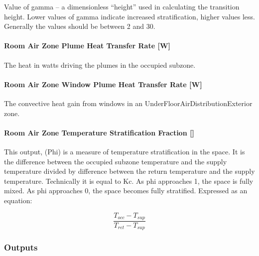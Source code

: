 Value of gamma -- a dimensionless ``height'' used in calculating the transition height. Lower values of gamma indicate increased stratification, higher values less. Generally the values should be between 2 and 30.

\paragraph{Room Air Zone Plume Heat Transfer Rate {[}W{]}}\label{room-air-zone-plume-heat-transfer-rate-w}

The heat in watts driving the plumes in the occupied subzone.

\paragraph{Room Air Zone Window Plume Heat Transfer Rate {[}W{]}}\label{room-air-zone-window-plume-heat-transfer-rate-w}

The convective heat gain from windows in an UnderFloorAirDistributionExterior zone.

\paragraph{\texorpdfstring{Room Air Zone Temperature Stratification Fraction {[]}}{Room Air Zone Temperature Stratification Fraction }}\label{room-air-zone-temperature-stratification-fraction}

This output, (Phi) is a measure of temperature stratification in the space. It is the difference between the occupied subzone temperature and the supply temperature divided by difference between the return temperature and the supply temperature. Technically it is equal to Kc. As phi approaches 1, the space is fully mixed. As phi approaches 0, the space becomes fully stratified. Expressed as an equation:

\begin{equation}
  \frac{T_{occ} - T_{sup}}{T_{ret} - T_{sup}}
\end{equation}

\subsubsection{Outputs}\label{outputs-7-009}

